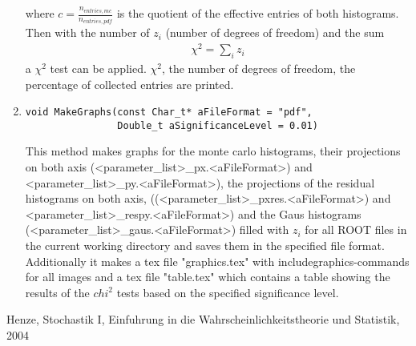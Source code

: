 \documentclass[10pt, a4paper]{article}
\begin{document}
\begin{enumerate}
where $c = \frac{n_{entries,mc}}{n_{entries,pdf}}$ is the quotient of the effective entries of both histograms.
Then with the number of $z_i$ (number of degrees of freedom) and the sum
\begin{gather}
\chi^2 = \sum_i z_i
\end{gather}
a $\chi^2$ test can be applied.
$\chi^2$, the number of degrees of freedom, the percentage of collected entries
are printed. 
\item
\begin{verbatim}
void MakeGraphs(const Char_t* aFileFormat = "pdf",
                Double_t aSignificanceLevel = 0.01)
\end{verbatim}
This method makes graphs for the monte carlo histograms, their projections on both axis (<parameter_list>_px.<aFileFormat>) and <parameter_list>_py.<aFileFormat>), the projections of the residual histograms on both axis, ((<parameter_list>_pxres.<aFileFormat>) and <parameter_list>_respy.<aFileFormat>)
and the Gaus histograms (<parameter_list>_gaus.<aFileFormat>) filled with $z_i$ for all ROOT files in the current working directory and saves them in the specified file format. \\
Additionally it makes a tex file "graphics.tex" with includegraphics-commands for all images and a tex file "table.tex" which contains a table showing the results of the $chi^2$ tests based on the specified significance level.
\end{enumerate}









\begin{thebibliography}{1cm}
 Henze, Stochastik I, Einfuhrung in die Wahrscheinlichkeitstheorie und Statistik, 2004
\end{thebibliography}
\end{document}
